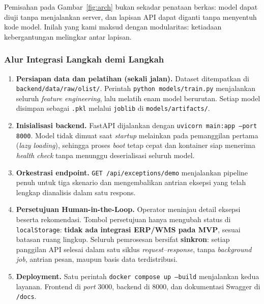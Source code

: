 \documentclass[12pt,a4paper]{article}
\begin{document}
Pemisahan pada Gambar~\ref{fig:arch} bukan sekadar penataan berkas: model dapat diuji tanpa menjalankan server, dan lapisan API dapat diganti tanpa menyentuh kode model. Inilah yang kami maksud dengan modularitas: ketiadaan kebergantungan melingkar antar lapisan.

\subsubsection{Alur Integrasi Langkah demi Langkah}

\begin{enumerate}
  \item \textbf{Persiapan data dan pelatihan (sekali jalan).} Dataset ditempatkan di \texttt{backend/data/raw/olist/}. Perintah \texttt{python models/train.py} menjalankan seluruh \textit{feature engineering}, lalu melatih enam model berurutan. Setiap model disimpan sebagai \texttt{.pkl} melalui \texttt{joblib} di \texttt{models/artifacts/}.

  \item \textbf{Inisialisasi backend.} FastAPI dijalankan dengan \texttt{uvicorn main:app --port 8000}. Model tidak dimuat saat \textit{startup} melainkan pada pemanggilan pertama (\textit{lazy loading}), sehingga proses \textit{boot} tetap cepat dan kontainer siap menerima \textit{health check} tanpa menunggu deserialisasi seluruh model.

  \item \textbf{Orkestrasi endpoint.} \texttt{GET /api/exceptions/demo} menjalankan pipeline penuh untuk tiga skenario dan mengembalikan antrian eksepsi yang telah lengkap dianalisis dalam satu respons.

  \item \textbf{Persetujuan Human-in-the-Loop.} Operator meninjau detail eksepsi beserta rekomendasi. Tombol persetujuan hanya mengubah status di \texttt{localStorage}: \textbf{tidak ada integrasi ERP/WMS pada MVP}, sesuai batasan ruang lingkup. Seluruh pemrosesan bersifat \textbf{sinkron}: setiap panggilan API selesai dalam satu siklus \textit{request--response}, tanpa \textit{background job}, antrian pesan, maupun basis data terdistribusi.

  \item \textbf{Deployment.} Satu perintah \texttt{docker compose up --build} menjalankan kedua layanan. Frontend di \textit{port} 3000, backend di 8000, dan dokumentasi Swagger di \texttt{/docs}.
\end{enumerate}
\end{document}
